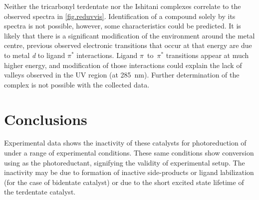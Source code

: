 Neither the tricarbonyl terdentate nor the Ishitani complexes correlate to the observed spectra in \autoref{fig.reduvvis}. Identification of a compound solely by its spectra is not possible, however, some characteristics could be predicted. It is likely that there is a significant modification of the environment around the metal centre, previous observed electronic transitions that occur at that energy are due to metal \textit{d} to ligand $\pi^\ast$ interactions. Ligand $\pi$~to~$\pi^\ast$ transitions appear at much higher energy, and modification of those interactions could explain the lack of valleys observed in  the UV region (at 285~nm). Further determination of the complex is not possible with the collected data.

\section{Conclusions}

Experimental data shows the inactivity of these catalysts for photoreduction of  under a range of experimental conditions. These same conditions show conversion using  as the photoreductant, signifying the validity of experimental setup. The inactivity may be due to formation of inactive side-products or ligand labilization (for the case of bidentate catalyst) or due to the short excited state lifetime of the terdentate catalyst. 
